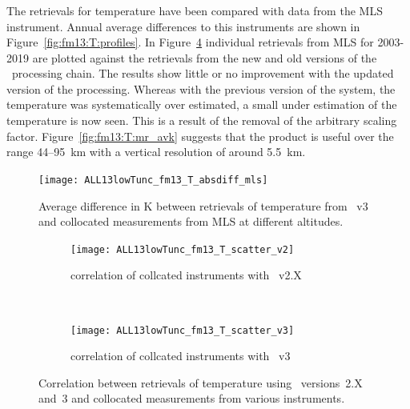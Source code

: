 
\subsubsection{}
\label{sec:fm13:comparison:temperature}
The retrievals for temperature have been compared with data from the MLS
instrument. Annual average differences to this instruments are shown in
Figure~\ref{fig:fm13:T:profiles}. In Figure~\ref{fig:fm13:T:scatter} individual
retrievals from MLS for 2003-2019 are plotted against the retrievals
from the new and old versions of the \smr\ processing chain. The results show
little or no improvement with the updated version of the processing. Whereas
with the previous version of the system, the temperature was systematically
over estimated, a small under estimation of the temperature is now seen. This
is a result of the removal of the arbitrary scaling factor.
Figure~\ref{fig:fm13:T:mr_avk} suggests that the product is useful over the
range 44--95~km with a vertical resolution of around 5.5~km.

\begin{figure}[tbhp]
    \centering
    \texttt{[image: ALL13lowTunc\_fm13\_T\_absdiff\_mls]}
    \caption{Average difference in K between retrievals of temperature from
    \smr~v3 and collocated measurements from MLS at different altitudes.}
    \label{fig:fm13:T:profiles}
        \label{fig:fm13:T:profiles:MLS}
\end{figure}

\begin{figure}[tbhp]
    \centering
    \begin{subfigure}[b]{0.49\textwidth}
        \texttt{[image: ALL13lowTunc\_fm13\_T\_scatter\_v2]}
        \caption{correlation of collcated instruments with \smr~v2.X}
        \label{fig:fm13:T:scatter:v2}
    \end{subfigure}
    \,
    \begin{subfigure}[b]{0.49\textwidth}
        \texttt{[image: ALL13lowTunc\_fm13\_T\_scatter\_v3]}
        \caption{correlation of collcated instruments with \smr~v3}
        \label{fig:fm13:T:scatter:v3}
    \end{subfigure}
    \caption{Correlation between retrievals of temperature using \smr\
    versions~2.X and~3 and collocated measurements from various instruments.}
    \label{fig:fm13:T:scatter}
\end{figure}

